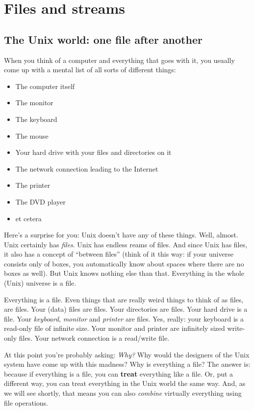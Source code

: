\section{Files and streams}
\subsection{The Unix world: one file after another}
When you think of a computer and everything that goes with it, you usually come
up with a mental list of all sorts of different things:

\begin{itemize}
\setlength{\leftmargin}{0pt}
\setlength{\itemsep}{0pt}
\setlength{\parsep}{0pt}
\setlength{\parskip}{0pt}
	\item The computer itself
	\item The monitor
	\item The keyboard
	\item The mouse
	\item Your hard drive with your files and directories on it
	\item The network connection leading to the Internet
	\item The printer
	\item The DVD player
	\item et cetera
\end{itemize}

Here's a surprise for you: Unix doesn't have any of these things. Well, almost.
Unix certainly has \emph{files}. Unix has endless reams of files. And since
Unix has files, it also has a concept of ``between files'' (think of it this
way: if your universe consists only of boxes, you automatically know about
spaces where there are no boxes as well). But Unix knows nothing else than
that. Everything in the whole (Unix) universe is a file.

Everything is a file. Even things that are really weird things to think of as
files, are files. Your (data) files are files. Your directories are files. Your
hard drive is a file. Your \emph{keyboard}, \emph{monitor} and \emph{printer}
are files. Yes, really: your keyboard is a read-only file of infinite size.
Your monitor and printer are infinitely sized write-only files. Your network
connection is a read/write file.

At this point you're probably asking: \emph{Why?} Why would the designers of
the Unix system have come up with this madness? Why is everything a file? The
answer is: because if everything is a file, you can \textbf{treat} everything
like a file. Or, put a different way, you can treat everything in the Unix
world the same way. And, as we will see shortly, that means you can also
\emph{combine} virtually everything using file operations.

